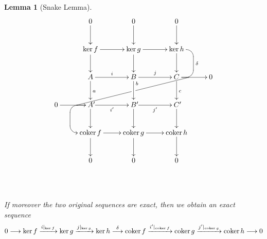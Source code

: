 \documentclass[11pt]{book}
\numberwithin{dummy}{section}
\newtheorem{lemma}[theorem]{Lemma}
\theoremstyle{nonumberbreak}
\newcommand*\pp{{\rlap{\('\)}}}
\newcommand{\cokern}{\mathrm{coker}\hspace{1.5pt}}
\newcommand{\la}{\longrightarrow}
\begin{document}
\begin{spacing}{1.4}
\begin{lemma}[Snake Lemma]
\[
  \xymatrix@!R{
                & 0                  & 0                  & 0                      \\
 & {\ker f} \ar[r]   & {\ker g} \ar[r]   & {\ker h}
                \ar@{-}`r[d]`[d]^\delta[d] %
                                                                               & \\
  & A    \ar[r]^{i}    & B  \ar[r]^{j}      & C \ar[r]
                 \ar@{}+<0.6cm,0cm>="p1"  %
                                                                               & 0 \\
0 \ar[r]        & A\pp \ar[r]_{i'}
                 \ar@{}[l]+<1cm,0cm>="p2" %
                 \ar`_l[l]+<1.03cm,0cm>`[d]`[d][d] %
                               & B
                               \pp \ar[r]_{j'}   & C\pp       &  \\
          & {\cokern f} \ar[r] & {\cokern g} \ar[r] & {\cokern h} &  \\
          & 0                  & 0                  & 0                            \\
\ar"1,2";"2,2"   \ar"1,3";"2,3"     \ar"1,4";"2,4"
\ar"2,2";"3,2"   \ar"2,3";"3,3"     \ar"2,4";"3,4"
\ar"3,2";"4,2"^a \ar"3,3";"4,3"^<<b \ar"3,4";"4,4"^c
\ar"4,2";"5,2"   \ar"4,3";"5,3"     \ar"4,4";"5,4"
\ar"5,2";"6,2"   \ar"5,3";"6,3"     \ar"5,4";"6,4"
\ar@{-}"p1";"p2"|!{"2,3";"3,3"}\hole
}
\]

If moreover the two original sequences are exact, then we obtain an exact sequence
$$0 \la \ker f \xrightarrow{ i \vert_{\ker f}} \ker g \xrightarrow{j\vert_{\ker g}} \ker h \overset{\delta}{\la} \cokern f \xrightarrow{i'\vert_{\cokern f}} \cokern g \xrightarrow{j'\vert_{\cokern g}} \cokern h \la 0$$





\end{lemma}
\end{spacing}
\end{document}
